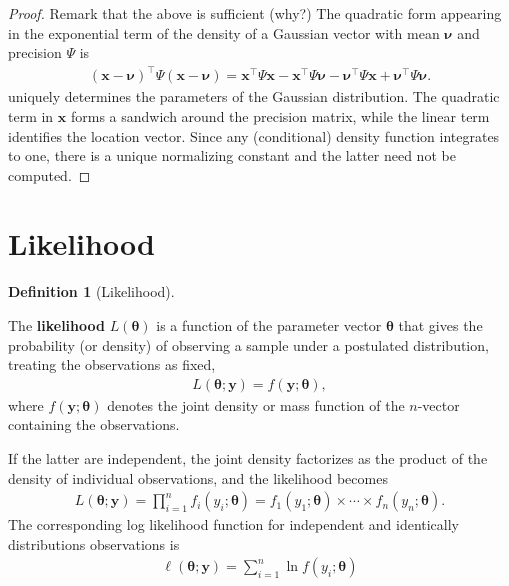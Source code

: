 \documentclass[
  11pt,
  letterpaper,
]{scrbook}
\theoremstyle{definition}
\theoremstyle{plain}
\theoremstyle{plain}
\theoremstyle{definition}
\theoremstyle{definition}
\newtheorem{definition}{Definition}[chapter]
\theoremstyle{remark}
\begin{document}
\begin{proof}
Remark that the above is sufficient (why?) The quadratic form appearing
in the exponential term of the density of a Gaussian vector with mean
\(\boldsymbol{\nu}\) and precision \(\boldsymbol{\varPsi}\) is
\begin{align*}
 (\boldsymbol{x}-\boldsymbol{\nu})^\top\boldsymbol{\varPsi}(\boldsymbol{x}-\boldsymbol{\nu})= \boldsymbol{x}^\top\boldsymbol{\varPsi}\boldsymbol{x} - \boldsymbol{x}^\top\boldsymbol{\varPsi}\boldsymbol{\nu} - 
\boldsymbol{\nu}^\top\boldsymbol{\varPsi}\boldsymbol{x} + \boldsymbol{\nu}^\top\boldsymbol{\varPsi}\boldsymbol{\nu}.
\end{align*} uniquely determines the parameters of the Gaussian
distribution. The quadratic term in \(\boldsymbol{x}\) forms a sandwich
around the precision matrix, while the linear term identifies the
location vector. Since any (conditional) density function integrates to
one, there is a unique normalizing constant and the latter need not be
computed.

\end{proof}

\section{Likelihood}\label{likelihood}

\begin{definition}[Likelihood]\protect\hypertarget{def-likelihood}{}\label{def-likelihood}

The \textbf{likelihood} \(L(\boldsymbol{\theta})\) is a function of the
parameter vector \(\boldsymbol{\theta}\) that gives the probability (or
density) of observing a sample under a postulated distribution, treating
the observations as fixed, \begin{align*}
L(\boldsymbol{\theta}; \boldsymbol{y}) = f(\boldsymbol{y}; \boldsymbol{\theta}),
\end{align*} where \(f(\boldsymbol{y}; \boldsymbol{\theta})\) denotes
the joint density or mass function of the \(n\)-vector containing the
observations.

If the latter are independent, the joint density factorizes as the
product of the density of individual observations, and the likelihood
becomes \begin{align*}
L(\boldsymbol{\theta}; \boldsymbol{y})=\prod_{i=1}^n f_i(y_i; \boldsymbol{\theta}) = f_1(y_1; \boldsymbol{\theta}) \times \cdots \times f_n(y_n; \boldsymbol{\theta}).
\end{align*} The corresponding log likelihood function for independent
and identically distributions observations is \begin{align*}
\ell(\boldsymbol{\theta}; \boldsymbol{y}) = \sum_{i=1}^n \ln f(y_i; \boldsymbol{\theta})
\end{align*}

\end{definition}
\end{document}
